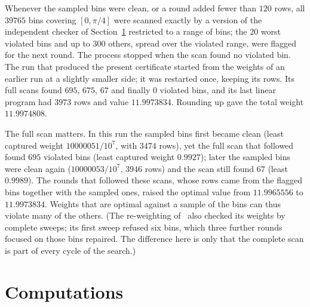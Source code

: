 \documentclass[11pt]{amsart}
\theoremstyle{definition}
\theoremstyle{remark}
\newcommand{\Wdec}{11.9974808}
\begin{document}
Whenever the sampled bins were clean, or a round added fewer than $120$ rows, all $39765$ bins covering $[0,\pi/4]$ were scanned exactly by a version of the independent checker of Section~\ref{sec:comp} restricted to a range of bins; the $20$ worst violated bins and up to $300$ others, spread over the violated range, were flagged for the next round. The process stopped when the scan found no violated bin. The run that produced the present certificate started from the weights of an earlier run at a slightly smaller side; it was restarted once, keeping its rows. Its full scans found $695$, $675$, $67$ and finally $0$ violated bins, and its last linear program had $3973$ rows and value $11.9973834$. Rounding up gave the total weight $\Wdec$.

The full scan matters. In this run the sampled bins first became clean (least captured weight $10000051/10^7$, with $3474$ rows), yet the full scan that followed found $695$ violated bins (least captured weight $0.9927$); later the sampled bins were clean again ($10000053/10^7$, $3946$ rows) and the scan still found $67$ (least $0.9989$). The rounds that followed these scans, whose rows came from the flagged bins together with the sampled ones, raised the optimal value from $11.9965556$ to $11.9973834$. Weights that are optimal against a sample of the bins can thus violate many of the others. (The re-weighting of~\cite{Lev26b} also checked its weights by complete sweeps; its first sweep refused six bins, which three further rounds focused on those bins repaired. The difference here is only that the complete scan is part of every cycle of the search.)

\section{Computations}\label{sec:comp}
\end{document}
